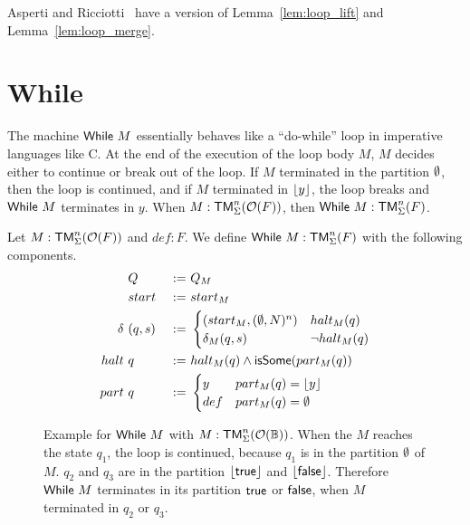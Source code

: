 Asperti and Ricciotti~\cite{asperti2015} have a version of Lemma~\ref{lem:loop_lift} and Lemma~\ref{lem:loop_merge}.

\section{While}
\label{sec:While}


The machine $\mathsf{While}~M$ essentially behaves like a ``do-while'' loop in imperative languages like C.  At the end of the execution of the loop body $M$,
$M$ decides either to continue or break out of the loop.  If $M$ terminated in the partition $\emptyset$, then the loop is continued, and if $M$
terminated in $\left\lfloor {y} \right\rfloor$, the loop breaks and $\mathsf{While}~M$ terminates in $y$.  When $M : \mathsf{TM}_\Sigma^n(\mathcal{O}(F))$, then $\mathsf{While}~M : \mathsf{TM}_\Sigma^n(F)$.

\begin{definition}[$\MS{While}~M$]
  \label{def:While}
  Let $M : \mathsf{TM}_\Sigma^n(\mathcal{O}(F))$ and $def:F$.  We define $\mathsf{While}~M : \mathsf{TM}_\Sigma^n(F)$ with the following components.
  \begin{alignat*}{3}
    & Q              &~:=~& Q_M \\
    & start          &~:=~& start_M \\
    \delta ~& (q, s) &~:=~&
    \begin{cases}
      (start_M, (\emptyset, N)^n) & halt_M(q) \\
      \delta_M (q,s)    & \lnot halt_M(q)
    \end{cases} \\
    halt ~& q      &~:=~& halt_M(q) \land \mathsf{isSome}(part_M(q)) \\
    part ~& q      &~:=~&
    \begin{cases}
      y   & part_M(q) = \left\lfloor {y} \right\rfloor \\
      def & part_M(q) = \emptyset
    \end{cases}
  \end{alignat*}
\end{definition}

\begin{figure}
  \center
  
  \caption{Example for $\mathsf{While}~M$ with $M:\mathsf{TM}_\Sigma^n(\mathcal{O}(\mathbb{B}))$.  When the $M$ reaches the state $q_1$, the loop is continued, because $q_1$
    is in the partition $\emptyset$ of $M$.  $q_2$ and $q_3$ are in the partition $\left\lfloor {\ensuremath{\mathsf{true}}} \right\rfloor$ and $\left\lfloor {\ensuremath{\mathsf{false}}} \right\rfloor$.  Therefore $\mathsf{While}~M$ terminates in
    its partition $\mathsf{true}$ or $\mathsf{false}$, when $M$ terminated in $q_2$ or $q_3$.}
  \label{fig:while-example}
\end{figure}

